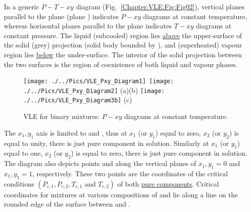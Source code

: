 In a generic $P-T-xy$ diagram (Fig.~\ref{Chapter:VLE:Fig:Fig02}), vertical planes parallel to the  plane (\eg plane ) indicates $P-xy$ diagrams at constant temperature, whereas horizontal planes parallel to the  plane indicates $T-xy$ diagrams at constant pressure. The liquid (\ie subcooled) region lies \underline{above} the upper-surface of the solid (grey) projection (solid body bounded by ), and (superheated) vapour region lies \underline{below} the under-surface. The interior of the solid projection between the two surfaces is the region of coexistence of both liquid and vapour phases. 
      \begin{figure}[h]
        \vbox{\hbox{\hspace{0.cm}\texttt{[image: ./../Pics/VLE\_Pxy\_Diagram1]}
            \hspace{-2.cm}\texttt{[image: ./../Pics/VLE\_Pxy\_Diagram2]}}
          \vspace{-0.5cm}
          \hbox{\hspace{3.5cm}(a)\hspace{6cm}(b)}
          \vspace{-0.cm}
          \hbox{\hspace{3.cm}\texttt{[image: ./../Pics/VLE\_Pxy\_Diagram3b]}}
          \vspace{-.1cm}
          \hbox{\hspace{6.8cm}(c)}}
        \vspace{-.1cm}\caption{VLE for binary mixtures: $P-xy$ diagrams at constant temperature.}\label{Chapter:VLE:Fig:Fig03}
      \end{figure}

The $x_{1},y_{1}$ axis is limited to  and , thus at $x_{1}$ (or $y_{1}$) equal to zero, $x_{2}$ (or $y_{2}$) is equal to unity, \ie there is just pure component  in solution. Similarly at $x_{1}$ (or $y_{1}$) equal to one, $x_{2}$ (or $y_{2}$) is equal to zero, \ie there is just pure component  in solution. The diagram also depicts points  and  along the vertical planes of $x_{1},y_{1}=0$ and $x_{1},y_{1}=1$, respectively. These two points are the coordinates of the critical conditions $\left(P_{c,1}, P_{c,2}, T_{c,1} \text{ and } T_{c,2}\right)$ of both \underline{pure components}. Critical coordinates for mixtures at various compositions of  and  lie along a line on the rounded edge of the surface between  and .


